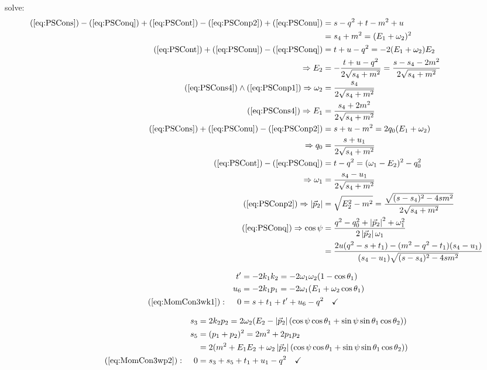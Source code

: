 \documentclass[
  english,		%
  a4paper,		%
  11pt,			%
  DIV=12,
  titlepage,
  toc=bibnumbered,
  parskip=full,  	%
  headings=normal,
  BCOR=12mm,
  numbers=noenddot
]{scrartcl}
\begin{document}
solve:
\begin{align}
(\ref{eq:PSCons}) - (\ref{eq:PSConq}) + (\ref{eq:PSCont}) - (\ref{eq:PSConp2}) + (\ref{eq:PSConu}) &= s-q^2+t-m^2+u\\
 &= s_4+m^2 = (E_1+\omega_2)^2 \label{eq:PSCons4}\\
(\ref{eq:PSCont}) + (\ref{eq:PSConu}) - (\ref{eq:PSConq}) &= t+u-q^2 = -2(E_1+\omega_2)E_2\\
\Rightarrow E_2 &= -\frac{t+u-q^2}{2\sqrt{s_4+m^2}} =\frac{s-s_4-2m^2}{2\sqrt{s_4+m^2}} \label{eq:PSConE2}\\
(\ref{eq:PSCons4})\land (\ref{eq:PSConp1}) \Rightarrow \omega_2 &= \frac{s_4}{2\sqrt{s_4+m^2}} \label{eq:PSConom2} \\
(\ref{eq:PSCons4})\Rightarrow E_1 &= \frac{s_4+2m^2}{2\sqrt{s_4+m^2}} \label{eq:PSConE1} \\
(\ref{eq:PSCons})+(\ref{eq:PSConu})-(\ref{eq:PSConp2}) &= s+u-m^2 =2q_0(E_1+\omega_2)\\
\Rightarrow q_0 &= \frac{s+u_1}{2\sqrt{s_4+m^2}} \label{eq:PSConq0}\\
(\ref{eq:PSCont}) - (\ref{eq:PSConq}) &= t-q^2 = (\omega_1-E_2)^2 - q_0^2\\
\Rightarrow \omega_1 &= \frac{s_4-u_1}{2\sqrt{s_4+m^2}} \label{eq:PSConom1}\\
(\ref{eq:PSConp2}) \Rightarrow \left|\vec p_2\right| &= \sqrt{E_2^2 - m^2} = \frac {\sqrt{(s-s_4)^2-4sm^2}} {2\sqrt{s_4+m^2}}\label{eq:PSConabsp2}\\
(\ref{eq:PSConq}) \Rightarrow \cos\psi &= \frac{q^2-q_0^2+\left|\vec p_2\right|^2+\omega_1^2}{2\left|\vec p_2\right|\omega_1}\\
 &= \frac {2u(q^2-s+t_1)-(m^2-q^2-t_1)(s_4-u_1)} {(s_4-u_1)\sqrt{(s-s_4)^2-4sm^2}}\label{eq:PSConabcos}
\end{align}

\begin{align}
&&t' &= -2k_1k_2 = -2\omega_1\omega_2(1-\cos\theta_1)\\
&&u_6 &= - 2k_1p_1 = -2\omega_1(E_1 + \omega_2\cos\theta_1)\\
(\ref{eq:MomCon3wk1}): &&0 &= s+t_1+t'+u_6-q^2\quad\checkmark
\end{align}

\begin{align}
&&s_3 &= 2k_2p_2 = 2\omega_2(E_2-\left|\vec p_2\right|(\cos\psi\cos\theta_1+\sin\psi\sin\theta_1\cos\theta_2))\\
&&s_5 &= (p_1+p_2)^2 = 2m^2+2p_1p_2\\
&& &= 2(m^2+E_1E_2+\omega_2\left|\vec p_2\right|(\cos\psi\cos\theta_1+\sin\psi\sin\theta_1\cos\theta_2))\\
(\ref{eq:MomCon3wp2}): &&0 &= s_3+s_5+t_1+u_1-q^2\quad\checkmark
\end{align}
\end{document}
